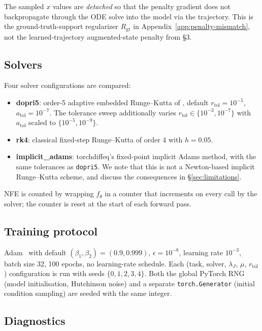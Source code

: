 \documentclass[11pt]{article}
\theoremstyle{plain}
\theoremstyle{definition}
\begin{document}
The sampled $x$ values are \emph{detached} so that the penalty gradient does
not backpropagate through the ODE solve into the model via the trajectory. This
is the ground-truth-support regularizer $R_\mathrm{gt}$ in
Appendix~\ref{app:penalty-mismatch}, not the learned-trajectory
augmented-state penalty from \citet{finlay2020train} \S 3.

\subsection{Solvers}
\label{sec:solvers}

Four solver configurations are compared:

\begin{itemize}[leftmargin=2em]
\item \textbf{dopri5}: order-5 adaptive embedded Runge--Kutta of
  \citet{dormand1980family}, default $r_\text{tol} = 10^{-5}$,
  $a_\text{tol} = 10^{-7}$. The tolerance sweep additionally varies
  $r_\text{tol} \in \{10^{-3}, 10^{-7}\}$ with $a_\text{tol}$ scaled to
  $\{10^{-5}, 10^{-9}\}$.
\item \textbf{rk4}: classical fixed-step Runge--Kutta of order 4 with
  $h = 0.05$.
\item \textbf{implicit\_adams}: torchdiffeq's fixed-point implicit Adams
  method, with the same tolerances as \texttt{dopri5}. We note that this is
  not a Newton-based implicit Runge--Kutta scheme, and discuss the
  consequences in \S\ref{sec:limitations}.
\end{itemize}

NFE is counted by wrapping $f_\theta$ in a counter that increments on every
call by the solver; the counter is reset at the start of each forward pass.

\subsection{Training protocol}
\label{sec:training}

Adam~\citep{kingma2015adam} with default $(\beta_1, \beta_2) = (0.9, 0.999)$,
$\epsilon = 10^{-8}$, learning rate $10^{-3}$, batch size 32, 100 epochs, no
learning-rate schedule. Each (task, solver, $\lambda_J$, $\mu$, $r_\text{tol}$)
configuration is run with seeds $\{0, 1, 2, 3, 4\}$. Both the global PyTorch
RNG (model initialisation, Hutchinson noise) and a separate
\texttt{torch.Generator} (initial condition sampling) are seeded with the same
integer.

\subsection{Diagnostics}
\label{sec:diagnostics}
\end{document}
